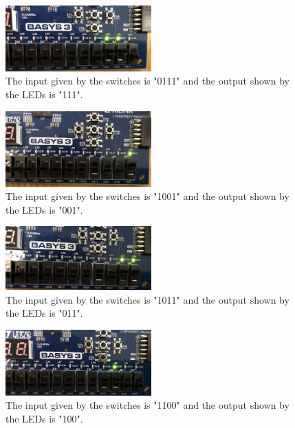 \documentclass[11pt]{article}
\begin{document}
\begin{figure}[H]
\begin{center}
	\includegraphics[width=0.5\textwidth]{../report-images/Part1/IMG_3083.jpg}
	\caption{\label{fig:p1img4}The input given by the switches is "0111" and the output shown by the LEDs is "111".}
\end{center}
\end{figure}

\begin{figure}[H]
\begin{center}
	\includegraphics[width=0.5\textwidth]{../report-images/Part1/IMG_3086.jpg}
	\caption{\label{fig:p1img6}The input given by the switches is "1001" and the output shown by the LEDs is "001".}
\end{center}
\end{figure}

\begin{figure}[H]
\begin{center}
	\includegraphics[width=0.5\textwidth]{../report-images/Part1/IMG_3088.jpg}
	\caption{\label{fig:p1img7}The input given by the switches is "1011" and the output shown by the LEDs is "011".}
\end{center}
\end{figure}

\begin{figure}[H]
\begin{center}
	\includegraphics[width=0.5\textwidth]{../report-images/Part1/IMG_3089.jpg}
	\caption{\label{fig:p1img8}The input given by the switches is "1100" and the output shown by the LEDs is "100".}
\end{center}
\end{figure}
\end{document}
